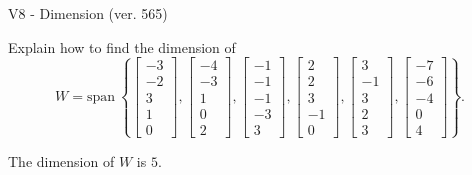 \begin{exercise}
  \begin{exerciseTitle}V8 - Dimension (ver. 565)\end{exerciseTitle}
  \begin{exerciseStatement}
    Explain how to find the dimension of 
\[W=\mathrm{span}\ \left\{\left[\begin{array}{r}
-3 \\
-2 \\
3 \\
1 \\
0
\end{array}\right] , \left[\begin{array}{r}
-4 \\
-3 \\
1 \\
0 \\
2
\end{array}\right] , \left[\begin{array}{r}
-1 \\
-1 \\
-1 \\
-3 \\
3
\end{array}\right] , \left[\begin{array}{r}
2 \\
2 \\
3 \\
-1 \\
0
\end{array}\right] , \left[\begin{array}{r}
3 \\
-1 \\
3 \\
2 \\
3
\end{array}\right] , \left[\begin{array}{r}
-7 \\
-6 \\
-4 \\
0 \\
4
\end{array}\right]\right\}.\]



  \end{exerciseStatement}
  \begin{exerciseAnswer}
   The dimension of \(W\) is  \(5\).
  


  \end{exerciseAnswer}
\end{exercise}